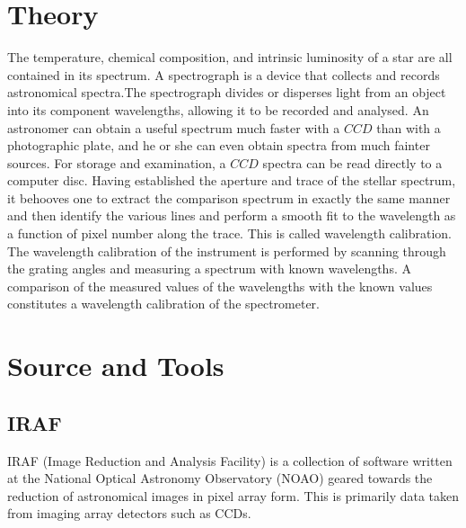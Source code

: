 \documentclass[letterpaper,11pt]{report}
\begin{document}
\section{Theory}
The temperature, chemical composition, and intrinsic luminosity of a star are all contained in its spectrum. A
spectrograph is a device that collects and records astronomical spectra.The spectrograph divides or disperses
light from an object into its component wavelengths, allowing it to be recorded and analysed. An astronomer
can obtain a useful spectrum much faster with a $CCD$ than with a photographic plate, and he or she can even
obtain spectra from much fainter sources. For storage and examination, a $CCD$ spectra can be read directly to
a computer disc.
Having established the aperture and trace of the stellar spectrum, it behooves one to extract the comparison
spectrum in exactly the same manner and then identify the various lines and perform a smooth fit to the
wavelength as a function of pixel number along the trace. This is called wavelength calibration. The wavelength
calibration of the instrument is performed by scanning through the grating angles and measuring a spectrum
with known wavelengths. A comparison of the measured values of the wavelengths with the known values
constitutes a wavelength calibration of the spectrometer.

\section{Source and Tools}
\subsection{IRAF}
IRAF (Image Reduction and Analysis Facility) is a collection of software written at the National Optical Astronomy Observatory (NOAO) geared towards the reduction of astronomical images in pixel array form. This is primarily data taken from imaging array detectors such as CCDs.
    
\end{document}

